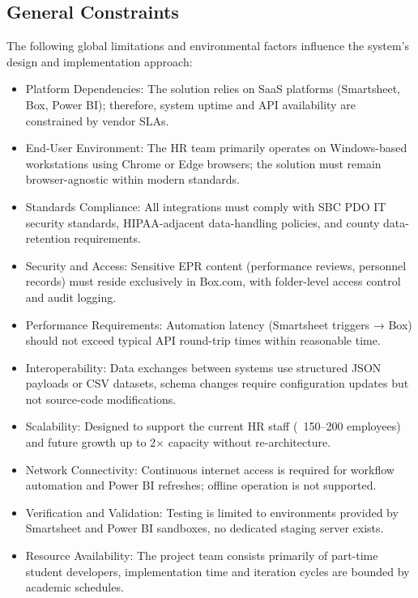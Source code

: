 \documentclass[12pt]{article}
\def\textbf#1{#1}%
\begin{document}
\subsection{General Constraints}

The following global limitations and environmental factors influence the system’s design and implementation approach:

\begin{itemize}[nosep]
    \item \textbf{Platform Dependencies:} The solution relies on SaaS platforms (Smartsheet, Box, Power BI); therefore, system uptime and API availability are constrained by vendor SLAs.
    \item \textbf{End-User Environment:} The HR team primarily operates on Windows-based workstations using Chrome or Edge browsers; the solution must remain browser-agnostic within modern standards.
    \item \textbf{Standards Compliance:} All integrations must comply with SBC PDO IT security standards, HIPAA-adjacent data-handling policies, and county data-retention requirements.
    \item \textbf{Security and Access:} Sensitive EPR content (performance reviews, personnel records) must reside exclusively in Box.com, with folder-level access control and audit logging.
    \item \textbf{Performance Requirements:} Automation latency (Smartsheet triggers → Box) should not exceed typical API round-trip times within reasonable time.
    \item \textbf{Interoperability:} Data exchanges between systems use structured JSON payloads or CSV datasets, schema changes require configuration updates but not source-code modifications.
    \item \textbf{Scalability:} Designed to support the current HR staff (~150–200 employees) and future growth up to 2× capacity without re-architecture.
    \item \textbf{Network Connectivity:} Continuous internet access is required for workflow automation and Power BI refreshes; offline operation is not supported.
    \item \textbf{Verification and Validation:} Testing is limited to environments provided by Smartsheet and Power BI sandboxes, no dedicated staging server exists.
    \item \textbf{Resource Availability:} The project team consists primarily of part-time student developers, implementation time and iteration cycles are bounded by academic schedules.
\end{itemize}
\end{document}
